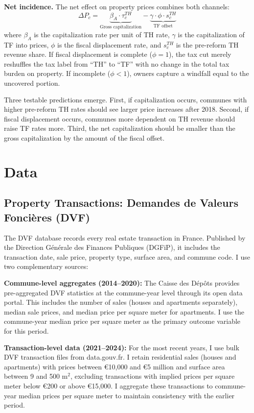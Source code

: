 \documentclass[12pt]{article}
\begin{document}
\textbf{Net incidence.} The net effect on property prices combines both channels:
\begin{equation}
\Delta P_c = \underbrace{\beta_A \cdot \tau^{TH}_c}_{\text{Gross capitalization}} - \underbrace{\gamma \cdot \phi \cdot s^{TH}_c}_{\text{TF offset}}
\label{eq:net}
\end{equation}
where $\beta_A$ is the capitalization rate per unit of TH rate, $\gamma$ is the capitalization of TF into prices, $\phi$ is the fiscal displacement rate, and $s^{TH}_c$ is the pre-reform TH revenue share. If fiscal displacement is complete ($\phi = 1$), the tax cut merely reshuffles the tax label from ``TH'' to ``TF'' with no change in the total tax burden on property. If incomplete ($\phi < 1$), owners capture a windfall equal to the uncovered portion.

Three testable predictions emerge. First, if capitalization occurs, communes with higher pre-reform TH rates should see larger price increases after 2018. Second, if fiscal displacement occurs, communes more dependent on TH revenue should raise TF rates more. Third, the net capitalization should be smaller than the gross capitalization by the amount of the fiscal offset.


\section{Data}

\subsection{Property Transactions: Demandes de Valeurs Fonci\`eres (DVF)}

The DVF database records every real estate transaction in France. Published by the Direction G\'en\'erale des Finances Publiques (DGFiP), it includes the transaction date, sale price, property type, surface area, and commune code. I use two complementary sources:

\textbf{Commune-level aggregates (2014--2020):} The Caisse des D\'ep\^ots provides pre-aggregated DVF statistics at the commune-year level through its open data portal. This includes the number of sales (houses and apartments separately), median sale prices, and median price per square meter for apartments. I use the commune-year median price per square meter as the primary outcome variable for this period.

\textbf{Transaction-level data (2021--2024):} For the most recent years, I use bulk DVF transaction files from data.gouv.fr. I retain residential sales (houses and apartments) with prices between \euro{}10,000 and \euro{}5 million and surface area between 9 and 500 m$^2$, excluding transactions with implied prices per square meter below \euro{}200 or above \euro{}15,000. I aggregate these transactions to commune-year median prices per square meter to maintain consistency with the earlier period.
\end{document}
